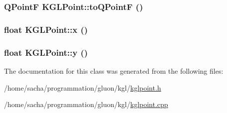 \hypertarget{class_k_g_l_point_91024421e8cca6c1f9752eea9e0f7c91}{
\subsubsection[{toQPointF}]{\setlength{\rightskip}{0pt plus 5cm}QPointF KGLPoint::toQPointF ()}}
\label{class_k_g_l_point_91024421e8cca6c1f9752eea9e0f7c91}


\hypertarget{class_k_g_l_point_336b4291f8554fdfc29e2c8e37290374}{
\subsubsection[{x}]{\setlength{\rightskip}{0pt plus 5cm}float KGLPoint::x ()}}
\label{class_k_g_l_point_336b4291f8554fdfc29e2c8e37290374}


\hypertarget{class_k_g_l_point_f13e00b27b57545e193c77f98eed8763}{
\subsubsection[{y}]{\setlength{\rightskip}{0pt plus 5cm}float KGLPoint::y ()}}
\label{class_k_g_l_point_f13e00b27b57545e193c77f98eed8763}




The documentation for this class was generated from the following files:\begin{CompactItemize}
\item 
/home/sacha/programmation/gluon/kgl/\hyperlink{kglpoint_8h}{kglpoint.h}\item 
/home/sacha/programmation/gluon/kgl/\hyperlink{kglpoint_8cpp}{kglpoint.cpp}\end{CompactItemize}

